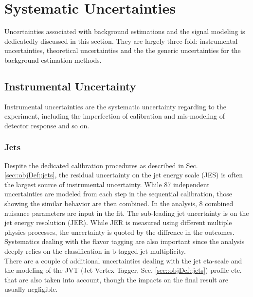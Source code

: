 \clearpage
\section{Systematic Uncertainties}  \label{sec::Uncertainties}
Uncertainties associated with background estimations and the signal modeling is dedicatedly discussed in this section.
They are largely three-fold: instrumental uncertainties, theoretical uncertainties and the the generic uncertainties for the background estimation methods. \\

\subsection{Instrumental Uncertainty}
Instrumental uncertainties are the systematic uncertainty regarding to the experiment, including the imperfection of calibration and mis-modeling of detector response and so on.
  
\subsubsection{Jets} 
Despite the dedicated calibration procedures as described in Sec. \ref{sec::objDef::jets}, the residual uncertainty on the jet energy scale (JES) is often the largest source of instrumental uncertainty. While 87 independent uncertainties are modeled from each step in the sequential calibration,
those showing the similar behavior are then combined. In the analysis, 8 combined nuisance parameters are input in the fit.
The sub-leading jet uncertainty is on the jet energy resolution (JER). While JER is measured using different multiple physics processes, the uncertainty is quoted by the diffrence in the outcomes.
Systematics dealing with the flavor tagging are also important since the analysis deeply relies on the classification in b-tagged jet multiplicity. 
\\
There are a couple of additional uncertainties dealing with the jet eta-scale and the modeling of the JVT (Jet Vertex Tagger, Sec. \ref{sec::objDef::jets}) profile etc. that are also taken into account, though the impacts on the final result are usually negligible. \\



